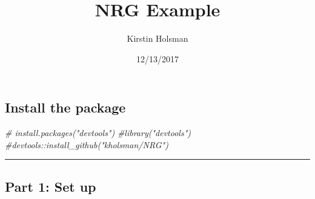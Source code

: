 \documentclass[]{article}
\title{NRG Example}
\author{Kirstin Holsman}
\date{12/13/2017}
\newenvironment{Shaded}{\begin{snugshade}}{\end{snugshade}}
\newcommand{\CommentTok}[1]{\textcolor[rgb]{0.56,0.35,0.01}{\textit{{#1}}}}
\begin{document}
\maketitle

\subsection{Install the package}\label{install-the-package}

\begin{Shaded}
\begin{Highlighting}[]
  \CommentTok{# install.packages("devtools")}
  \CommentTok{#library("devtools")}
  \CommentTok{#devtools::install_github("kholsman/NRG")}
\end{Highlighting}
\end{Shaded}

\begin{center}\rule{0.5\linewidth}{\linethickness}\end{center}

\subsection{Part 1: Set up}\label{part-1-set-up}
\end{document}
